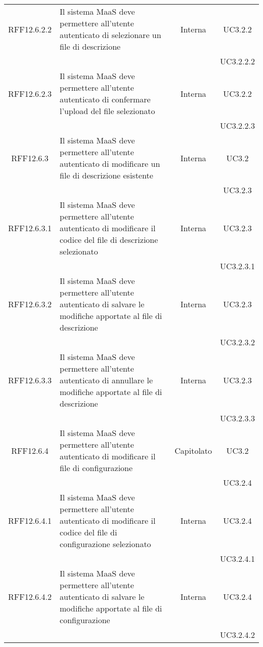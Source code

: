 \begin{longtable}{|c|p{6cm}|c|c|}
\midrule
RFF12.6.2.2
& Il sistema MaaS deve permettere all'utente autenticato di selezionare un file di descrizione
& Interna
& UC3.2.2\\
& & & UC3.2.2.2\\

\midrule
RFF12.6.2.3
& Il sistema MaaS deve permettere all'utente autenticato di confermare l'upload del file selezionato
& Interna
& UC3.2.2\\
& & & UC3.2.2.3\\


\midrule
RFF12.6.3
& Il sistema MaaS deve permettere all'utente autenticato di modificare un file di descrizione esistente
& Interna
& UC3.2\\
& & & UC3.2.3\\

\midrule
RFF12.6.3.1
& Il sistema MaaS deve permettere all'utente autenticato di modificare il codice del file di descrizione selezionato
& Interna
& UC3.2.3\\
& & & UC3.2.3.1\\

\midrule
RFF12.6.3.2
& Il sistema MaaS deve permettere all'utente autenticato di salvare le modifiche apportate al file di descrizione
& Interna
& UC3.2.3\\
& & & UC3.2.3.2\\

\midrule
RFF12.6.3.3
& Il sistema MaaS deve permettere all'utente autenticato di annullare le modifiche apportate al file di descrizione
& Interna
& UC3.2.3\\
& & & UC3.2.3.3\\

\midrule
RFF12.6.4
& Il sistema MaaS deve permettere all'utente autenticato di modificare il file di configurazione
& Capitolato
& UC3.2\\
& & & UC3.2.4\\

\midrule
RFF12.6.4.1
& Il sistema MaaS deve permettere all'utente autenticato di modificare il codice del file di configurazione selezionato
& Interna
& UC3.2.4\\
& & & UC3.2.4.1\\

\midrule
RFF12.6.4.2
& Il sistema MaaS deve permettere all'utente autenticato di salvare le modifiche apportate al file di configurazione
& Interna
& UC3.2.4\\
& & & UC3.2.4.2\\


\end{longtable}
